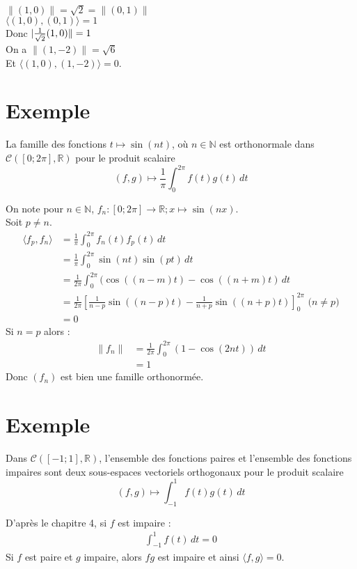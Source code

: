 \documentclass[../main.tex]{subfiles}
\begin{document}
\noindent $\| (1, 0)\| = \sqrt{2} = \| (0, 1)\|$ \\
$\langle (1, 0), (0, 1)\rangle = 1$ \\
Donc $\\| \frac{1}{\sqrt{2}}(1, 0)\| = 1$ \\
On a $\| (1, -2)\| = \sqrt{6}$ \\
Et $\langle (1, 0), (1, -2)\rangle = 0$. 

\section{Exemple}
\begin{tcolorbox}[title=Exemple 34.23, title filled=false, colframe=darkgreen, colback=darkgreen!10!white]
    La famille des fonctions $t \mapsto \sin (n t)$, où $n \in \mathbb{N}$ est orthonormale dans $\mathcal{C}([0 ; 2 \pi], \mathbb{R})$ pour le produit scalaire
    $$(f, g) \mapsto \frac{1}{\pi} \int_0^{2 \pi} f(t) g(t) \,dt$$
\end{tcolorbox}

\noindent On note pour $n\in \mathbb{N}$, $f_n: [0 ; 2\pi] \to \mathbb{R};x\mapsto \sin(nx)$. \\
Soit $p\neq n$. \\
\begin{align*}
    \langle f_p, f_n \rangle &= \frac{1}{\pi} \int_{0}^{2\pi} f_n(t) f_p(t) \,dt \\
    &= \frac{1}{\pi} \int_{0}^{2\pi} \sin(nt) \sin(pt) \,dt \\
    &= \frac{1}{2\pi} \int_{0}^{2\pi} (\cos((n-m)t) - \cos((n+m)t) \,dt \\
    &= \frac{1}{2\pi} \left[ \frac{1}{n-p} \sin((n-p)t) - \frac{1}{n+p}\sin((n+p)t) \right]^{2\pi}_0 \text{ ($n\neq p$)} \\
    &= 0
\end{align*}
Si $n = p$ alors : 
\begin{align*}
    \|f_n\| &= \frac{1}{2\pi} \int_{0}^{2\pi} (1 - \cos(2nt)) \,dt \\
    &= 1
\end{align*}
Donc $(f_n)$ est bien une famille orthonormée. 

\section{Exemple}
\begin{tcolorbox}[title=Exemple 34.24, title filled=false, colframe=darkgreen, colback=darkgreen!10!white]
    Dans $\mathcal{C}([-1 ; 1], \mathbb{R})$, l'ensemble des fonctions paires et l'ensemble des fonctions impaires sont deux sous-espaces vectoriels orthogonaux pour le produit scalaire
    $$(f, g) \mapsto \int_{-1}^1 f(t) g(t) \,dt$$
\end{tcolorbox}

\noindent D'après le chapitre 4, si $f$ est impaire : 
\begin{align*}
    \int_{-1}^{1} f(t) \,dt = 0
\end{align*}
Si $f$ est paire et $g$ impaire, alors $fg$ est impaire et ainsi $\langle f, g \rangle = 0$. 
\end{document}
